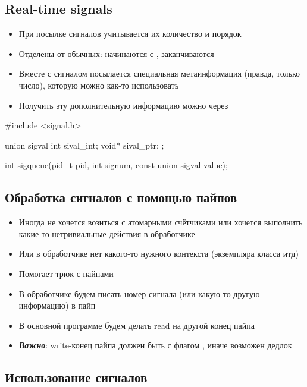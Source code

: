   \subsection{Real-time signals}
    \begin{itemize}
      \item При посылке сигналов учитывается их количество и порядок
      \item Отделены от обычных: начинаются с , заканчиваются 
      \item Вместе с сигналом посылается специальная метаинформация (правда, только число), которую можно как-то использовать
      \item Получить эту дополнительную информацию можно через 
    \end{itemize}
  
    \begin{cminted}
#include <signal.h>

union sigval {
  int    sival_int;
  void*  sival_ptr;
};

int sigqueue(pid_t pid, int signum, const union sigval value);  
    \end{cminted}

  \subsection{Обработка сигналов с помощью пайпов}
    \begin{itemize}
      \item Иногда не хочется возиться с атомарными счётчиками или хочется выполнить какие-то нетривиальные действия в обработчике
      \item Или в обработчике нет какого-то нужного контекста (экземпляра класса итд)
      \item Помогает трюк с пайпами
      \item В обработчике будем писать номер сигнала (или какую-то другую информацию) в пайп
      \item В основной программе будем делать read на другой конец пайпа
      \item \textbf{\textit{Важно}}: write-конец пайпа должен быть с флагом , иначе возможен дедлок
    \end{itemize}
  
  \subsection{Использование сигналов}
